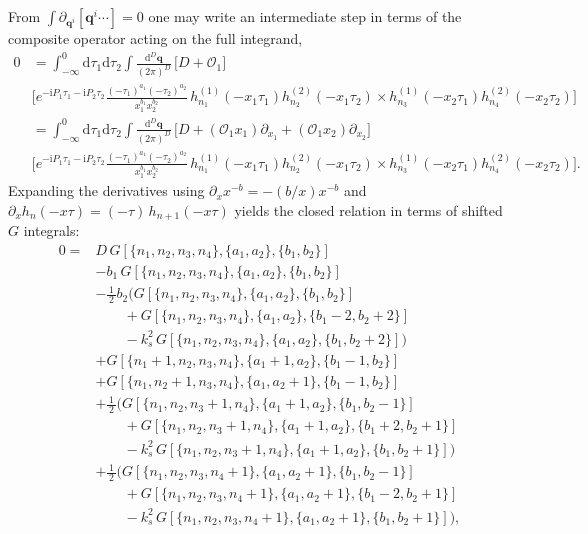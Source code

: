 \documentclass[a4paper,12pt]{article}
\newcommand{\FR}[2]{\displaystyle\frac{\,{#1}\,}{#2}}
\def\di{{\mathrm{d}}}
\def\pd{\partial}
\def\ii{\mathrm{i}}
\begin{document}
From $\int \pd_{\bm q^i}[\bm q^i \cdots ]=0$ one may write an intermediate step in terms of the composite operator acting on the full integrand,
\begin{align}
	0 &= \int_{-\infty}^0 \di\tau_1\di\tau_2\int \FR{\di^D \bm q}{(2\pi)^D}\,
	\Big[D+\mathcal{O}_1\Big] \nonumber\\ 
	& \Bigg[
	e^{-\ii P_1\tau_1-\ii P_2\tau_2}
	\frac{(-\tau_1)^{a_1}(-\tau_2)^{a_2}}{x_1^{b_1}x_2^{b_2}}\,
	h_{n_1}^{(1)}(-x_1\tau_1)h_{n_2}^{(2)}(-x_1\tau_2) \times h_{n_3}^{(1)}(-x_2\tau_1)h_{n_4}^{(2)}(-x_2\tau_2)\Bigg] \nonumber\\
	& =  \int_{-\infty}^0 \di\tau_1\di\tau_2\int \FR{\di^D \bm q}{(2\pi)^D}\,
	\Bigg[D+(\mathcal{O}_1 x_1)\partial_{x_1} +(\mathcal{O}_1 x_2)\partial_{x_2}\Bigg] \nonumber\\
	&\Bigg[
	e^{-\ii P_1\tau_1-\ii P_2\tau_2}
	\frac{(-\tau_1)^{a_1}(-\tau_2)^{a_2}}{x_1^{b_1}x_2^{b_2}}\,
	h_{n_1}^{(1)}(-x_1\tau_1)h_{n_2}^{(2)}(-x_1\tau_2)
	  \times h_{n_3}^{(1)}(-x_2\tau_1)h_{n_4}^{(2)}(-x_2\tau_2)\Bigg]. \label{eq:momIBP_qdot_chainrule}
\end{align}
Expanding the derivatives using $\partial_x x^{-b}=-(b/x)x^{-b}$ and $\partial_x h_n(-x\tau)=(-\tau)\,h_{n+1}(-x\tau)$ yields the closed relation in terms of shifted $G$ integrals:
\begin{align}
	0 ={}& D\,G[\{n_1,n_2,n_3,n_4\},\{a_1,a_2\},\{b_1,b_2\}] \nonumber\\
	&- b_1\,G[\{n_1,n_2,n_3,n_4\},\{a_1,a_2\},\{b_1,b_2\}] \nonumber \\
	&- \FR12 b_2\Big(
	G[\{n_1,n_2,n_3,n_4\},\{a_1,a_2\},\{b_1,b_2\}] \nonumber\\
	&\qquad + G[\{n_1,n_2,n_3,n_4\},\{a_1,a_2\},\{b_1-2,b_2+2\}] \nonumber\\
	&\qquad -k_s^2\,G[\{n_1,n_2,n_3,n_4\},\{a_1,a_2\},\{b_1,b_2+2\}]
	\Big) \nonumber \\
	&+G[\{n_1+1,n_2,n_3,n_4\},\{a_1+1,a_2\},\{b_1-1,b_2\}] \nonumber\\
	&+ G[\{n_1,n_2+1,n_3,n_4\},\{a_1,a_2+1\},\{b_1-1,b_2\}] \nonumber \\
	&+\FR12 \Big(
	G[\{n_1,n_2,n_3+1,n_4\},\{a_1+1,a_2\},\{b_1,b_2-1\}] \nonumber\\
	&\qquad + G[\{n_1,n_2,n_3+1,n_4\},\{a_1+1,a_2\},\{b_1+2,b_2+1\}] \nonumber\\
	&\qquad -k_s^2\,G[\{n_1,n_2,n_3+1,n_4\},\{a_1+1,a_2\},\{b_1,b_2+1\}]
	\Big) \nonumber \\
	&+\FR12\Big(
	G[\{n_1,n_2,n_3,n_4+1\},\{a_1,a_2+1\},\{b_1,b_2-1\}] \nonumber\\
	&\qquad + G[\{n_1,n_2,n_3,n_4+1\},\{a_1,a_2+1\},\{b_1-2,b_2+1\}] \nonumber\\
	&\qquad -k_s^2\,G[\{n_1,n_2,n_3,n_4+1\},\{a_1,a_2+1\},\{b_1,b_2+1\}]
	\Big),
\label{eq:momIBP_qdot}
\end{align}
\end{document}
